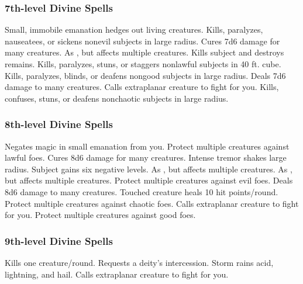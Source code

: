 \subsubsection{7th-level Divine Spells}
\begin{spelllist}
     Small, immobile emanation hedges out living creatures.
     Kills, paralyzes, nauseatees, or sickens nonevil subjects in large radius.
     Cures 7d6 damage for many creatures.
     As , but affects multiple creatures.
    \F Kills subject and destroys remains.
     Kills, paralyzes, stuns, or staggers nonlawful subjects in 40 ft. cube.
     Kills, paralyzes, blinds, or deafens nongood subjects in large radius.
     Deals 7d6 damage to many creatures.
     Calls extraplanar creature to fight for you.
     Kills, confuses, stuns, or deafens nonchaotic subjects in large radius.
\end{spelllist}

\subsubsection{8th-level Divine Spells}
\begin{spelllist}
     Negates magic in small emanation from you.
    \F Protect multiple creatures against lawful foes. 
     Cures 8d6 damage for many creatures.
     Intense tremor shakes large radius.
     Subject gains six negative levels.
     As , but affects multiple creatures.
     As , but affects multiple creatures.
    \F Protect multiple creatures against evil foes. 
     Deals 8d6 damage to many creatures.
     Touched creature heals 10 hit points/round.
    \F Protect multiple creatures against chaotic foes. 
     Calls extraplanar creature to fight for you.
    \F Protect multiple creatures against good foes. 
\end{spelllist}

\subsubsection{9th-level Divine Spells}
\begin{spelllist}
     Kills one creature/round.
    \M Requests a deity's intercession.
     Storm rains acid, lightning, and hail.
     Calls extraplanar creature to fight for you.
\end{spelllist}

